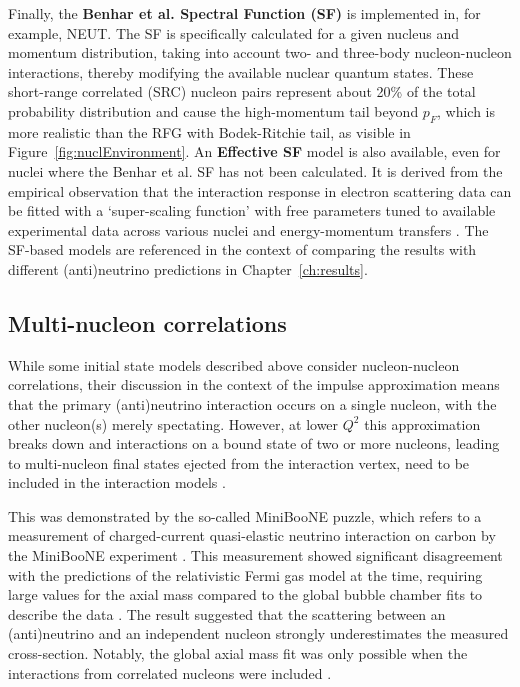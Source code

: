 Finally, the \textbf{Benhar et al. Spectral Function (SF)} \cite{Benhar:1994hw} is implemented in, for example, NEUT. The SF is specifically calculated for a given nucleus and momentum distribution, taking into account two- and three-body nucleon-nucleon interactions, thereby modifying the available nuclear quantum states. These short-range correlated (SRC) nucleon pairs represent about 20\% of the total probability distribution \cite{Subedi_2008} and cause the high-momentum tail beyond $p_F$, which is more realistic than the RFG with Bodek-Ritchie tail, as visible in Figure~\ref{fig:nuclEnvironment}. An \textbf{Effective SF} model \cite{Bodek_2014} is also available, even for nuclei where the Benhar et al. SF has not been calculated. It is derived from the empirical observation that the interaction response in electron scattering data can be fitted with a `super-scaling function' with free parameters tuned to available experimental data across various nuclei and energy-momentum transfers \cite{PhysRevC.60.065502}. The SF-based models are referenced in the context of comparing the results with different (anti)neutrino predictions in Chapter~\ref{ch:results}.

\subsection{Multi-nucleon correlations}

While some initial state models described above consider nucleon-nucleon correlations, their discussion in the context of the impulse approximation means that the primary (anti)neutrino interaction occurs on a single nucleon, with the other nucleon(s) merely spectating. However, at lower $Q^2$ this approximation breaks down and interactions on a bound state of two or more nucleons, leading to multi-nucleon final states ejected from the interaction vertex, need to be included in the interaction models \cite{2p2hGran2013_PhysRevD.88.113007, PhysRevC.80.065501, 2p2hNieves2011_PhysRevC.83.045501}. 

This was demonstrated by the so-called MiniBooNE puzzle, which refers to a measurement of charged-current quasi-elastic neutrino interaction on carbon by the MiniBooNE experiment \cite{PhysRevD.81.092005}. This measurement showed significant disagreement with the predictions of the relativistic Fermi gas model at the time, requiring large values for the axial mass compared to the global bubble chamber fits to describe the data \cite{PhysRevC.82.045502}. The result suggested that the scattering between an (anti)neutrino and an independent nucleon strongly underestimates the measured cross-section. Notably, the global axial mass fit was only possible when the interactions from correlated nucleons were included \cite{NIEVES201272}.


